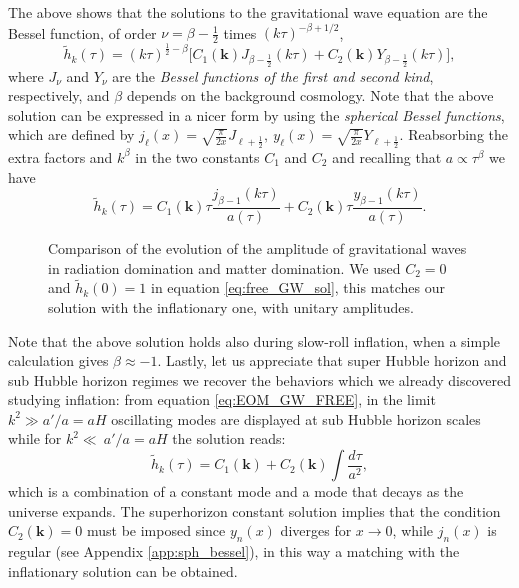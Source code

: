 The above shows that the solutions to the gravitational wave equation are the Bessel function, of order $\nu=\beta-\tfrac12$ times $(k\tau)^{-\beta+1/2}$,
$$\tilde h_k(\tau)=(k\tau)^{\frac{1}{2}-\beta}\bigg[C_1(\mathbf{k}) J_{\beta-\frac{1}{2}}(k\tau)+C_2(\mathbf{k}) Y_{\beta-\frac{1}{2}}(k\tau)\bigg],$$
where $J_\nu$ and $Y_\nu$ are the \emph{Bessel functions of the first and second kind}, respectively, and $\beta$ depends on the background cosmology. Note that the above solution can be expressed in a nicer form by using the \emph{spherical Bessel functions}, which are defined by $j_\ell(x)=\sqrt{\frac{\pi}{2x}}J_{\ell+\frac{1}{2}},\ y_\ell(x)=\sqrt{\frac{\pi}{2x}}Y_{\ell+\frac{1}{2}}$. Reabsorbing the extra factors and $k^{\beta}$ in the two constants $C_1$ and $C_2$ and recalling that $a\propto\tau^{\beta}$ we have
\begin{equation}
    \label{eq:free_GW_sol}
    \tilde h_k(\tau)=C_1(\mathbf{k})\tau\frac{j_{\beta-1}(k\tau)}{a(\tau)}+C_2(\mathbf{k})\tau\frac{y_{\beta-1}(k\tau)}{a(\tau)}.
\end{equation}
\begin{figure}
    \centering
{}
\caption{Comparison of the evolution of the amplitude of gravitational waves in radiation domination and matter domination. We used $C_2=0$ and $\tilde h_k(0)=1$ in equation \eqref{eq:free_GW_sol}, this matches our solution with the inflationary one, with unitary amplitudes.}
\label{fig:h_m/r}
\end{figure}
Note that the above solution holds also during slow-roll inflation, when a simple calculation gives $\beta\approx-1$. Lastly, let us appreciate that super Hubble horizon and sub Hubble horizon regimes we recover the behaviors which we already discovered studying inflation: from equation \eqref{eq:EOM_GW_FREE}, in the limit $k^2\gg a'/a=a H$ oscillating modes are displayed at sub Hubble horizon scales while for $k^2\ll\ a'/a=a H$ the solution reads:
$$\tilde h_k(\tau)=C_1(\mathbf k)+C_2(\mathbf k)\int\frac{d\tau}{a^2},$$ which is a combination of a constant mode and a mode that decays as the universe expands. The superhorizon constant solution implies that the condition $C_2(\mathbf k)=0$ must be imposed since $y_n(x)$ diverges for $x\to 0$, while $j_n(x)$ is regular (see Appendix \ref{app:sph_bessel}), in this way a matching with the inflationary solution can be obtained.
